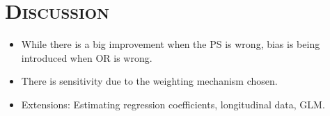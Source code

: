 \documentclass[xcolor=x11names,compress,table]{beamer}
\renewcommand{\(}{\begin{columns}}
\renewcommand{\)}{\end{columns}}
\newcommand{\<}[1]{\begin{column}{#1}}
\renewcommand{\>}{\end{column}}
\begin{document}
\section{\scshape Discussion}
\begin{frame}
\begin{itemize}\itemsep1em
\item While there is a big improvement when the PS is wrong, bias is being introduced when OR is wrong.
\item There is sensitivity due to the weighting mechanism chosen.
\item Extensions: Estimating regression coefficients, longitudinal data, GLM.
\end{itemize}
\end{frame}







    
\end{document}
